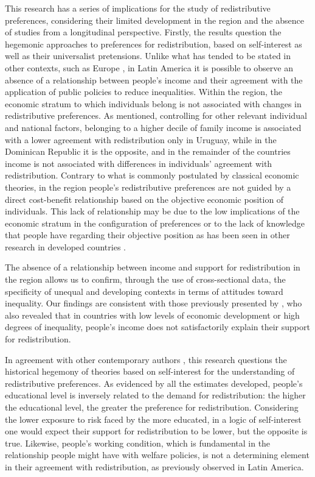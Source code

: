 \documentclass[utf8]{frontiersSCNS} %
\begin{document}
This research has a series of implications for the study of redistributive preferences, considering their limited development in the region and the absence of studies from a longitudinal perspective. Firstly, the results question the hegemonic approaches to preferences for redistribution, based on self-interest as well as their universalist pretensions. Unlike what has tended to be stated in other contexts, such as Europe \parencite{Schmidt-CatranEconomicinequalitypublic2016}, in Latin America it is possible to observe an absence of a relationship between people’s income and their agreement with the application of public policies to reduce inequalities. Within the region, the economic stratum to which individuals belong is not associated with changes in redistributive preferences. As mentioned, controlling for other relevant individual and national factors, belonging to a higher decile of family income is associated with a lower agreement with redistribution only in Uruguay, while in the Dominican Republic it is the opposite, and in the remainder of the countries income is not associated with differences in individuals’ agreement with redistribution. Contrary to what is commonly postulated by classical economic theories, in the region people’s redistributive preferences are not guided by a direct cost-benefit relationship based on the objective economic position of individuals. This lack of relationship may be due to the low implications of the economic stratum in the configuration of preferences or to the lack of knowledge that people have regarding their objective position as has been seen in other research in developed countries \parencite{engelhardt2018germans}.

The absence of a relationship between income and support for redistribution in the region allows us to confirm, through the use of cross-sectional data, the specificity of unequal and developing contexts in terms of attitudes toward inequality. Our findings are consistent with those previously presented by \textcite{DionEconomicDevelopmentIncome2010}, who also revealed that in countries with low levels of economic development or high degrees of inequality, people’s income does not satisfactorily explain their support for redistribution.

In agreement with other contemporary authors \parencite{amable2019new}, this research questions the historical hegemony of theories based on self-interest for the understanding of redistributive preferences. As evidenced by all the estimates developed, people’s educational level is inversely related to the demand for redistribution: the higher the educational level, the greater the preference for redistribution. Considering the lower exposure to risk faced by the more educated, in a logic of self-interest one would expect their support for redistribution to be lower, but the opposite is true. Likewise, people’s working condition, which is fundamental in the relationship people might have with welfare policies, is not a determining element in their agreement with redistribution, as \textcite{Berensexclusioncalculatingsolidarity2015} previously observed in Latin America.
\end{document}
